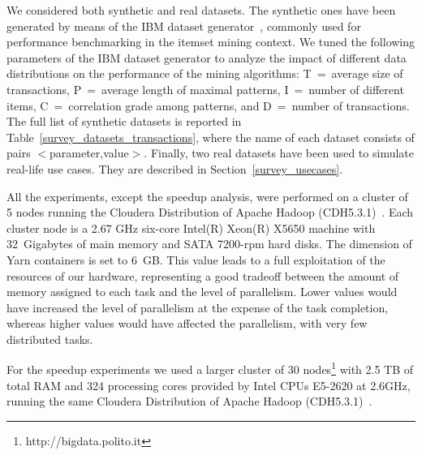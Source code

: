 We considered both synthetic and real datasets.
The synthetic ones have been
generated by means of the IBM dataset generator~\cite{Quest}, commonly used for performance benchmarking in the
itemset mining context.
We tuned the following parameters of the IBM dataset generator to analyze
the impact of different data distributions on the performance of the
mining algorithms:
T~=~average size of transactions,
P~=~average length of maximal patterns,
I~=~number of different items,
C~=~correlation grade among patterns, and
D~=~number of transactions.
The full list of synthetic datasets is reported in Table~\ref{survey_datasets_transactions},
where the name of each dataset consists of pairs $<$parameter,value$>$.
Finally, two real datasets have been used to simulate real-life use cases.
They are described in Section~\ref{survey_usecases}.

All the experiments, except the speedup analysis, 
were performed on a cluster of 5 nodes running the Cloudera
Distribution of Apache Hadoop (CDH5.3.1)~\cite{cloudera}.
Each cluster node is a 2.67 GHz six-core Intel(R) Xeon(R) X5650 machine
with 32~Gigabytes of main memory and SATA 7200-rpm hard disks.
The dimension of Yarn containers is set to 6~GB. This value leads to a
full exploitation of the resources of our hardware, representing a good
tradeoff between the amount of memory assigned to each task and the
level of parallelism.
Lower values would have increased the level of parallelism at the expense
of the task completion, whereas higher values would have affected
the parallelism, with very few distributed tasks.

For the speedup experiments we used a larger cluster of 30 nodes\footnote{http://bigdata.polito.it} 
with 2.5 TB of total RAM and 324 processing cores provided by Intel CPUs E5-2620 at 2.6GHz, 
running the same Cloudera Distribution of Apache Hadoop (CDH5.3.1)~\cite{cloudera}. 

